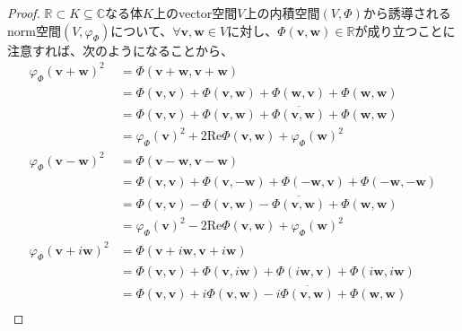 \documentclass[dvipdfmx]{jsarticle}
\begin{document}
\begin{proof}
$\mathbb{R} \subset K \subseteq \mathbb{C}$なる体$K$上のvector空間$V$上の内積空間$(V,\varPhi)$から誘導されるnorm空間$\left( V,\varphi_{\varPhi} \right)$について、$\forall\mathbf{v},\mathbf{w} \in V$に対し、$\varPhi\left( \mathbf{v},\mathbf{w} \right) \in \mathbb{R}$が成り立つことに注意すれば、次のようになることから、
\begin{align*}
{\varphi_{\varPhi}\left( \mathbf{v} + \mathbf{w} \right)}^{2} &= \varPhi\left( \mathbf{v} + \mathbf{w},\mathbf{v} + \mathbf{w} \right)\\
&= \varPhi\left( \mathbf{v},\mathbf{v} \right) + \varPhi\left( \mathbf{v},\mathbf{w} \right) + \varPhi\left( \mathbf{w},\mathbf{v} \right) + \varPhi\left( \mathbf{w},\mathbf{w} \right)\\
&= \varPhi\left( \mathbf{v},\mathbf{v} \right) + \varPhi\left( \mathbf{v},\mathbf{w} \right) + \overline{\varPhi\left( \mathbf{v},\mathbf{w} \right)} + \varPhi\left( \mathbf{w},\mathbf{w} \right)\\
&= {\varphi_{\varPhi}\left( \mathbf{v} \right)}^{2} + 2\mathrm{Re}{\varPhi\left( \mathbf{v},\mathbf{w} \right)} + {\varphi_{\varPhi}\left( \mathbf{w} \right)}^{2}\\
{\varphi_{\varPhi}\left( \mathbf{v} - \mathbf{w} \right)}^{2} &= \varPhi\left( \mathbf{v} - \mathbf{w},\mathbf{v} - \mathbf{w} \right)\\
&= \varPhi\left( \mathbf{v},\mathbf{v} \right) + \varPhi\left( \mathbf{v}, - \mathbf{w} \right) + \varPhi\left( \mathbf{- w},\mathbf{v} \right) + \varPhi\left( \mathbf{- w}, - \mathbf{w} \right)\\
&= \varPhi\left( \mathbf{v},\mathbf{v} \right) - \varPhi\left( \mathbf{v},\mathbf{w} \right) - \overline{\varPhi\left( \mathbf{v},\mathbf{w} \right)} + \varPhi\left( \mathbf{w},\mathbf{w} \right)\\
&= {\varphi_{\varPhi}\left( \mathbf{v} \right)}^{2} - 2\mathrm{Re}{\varPhi\left( \mathbf{v},\mathbf{w} \right)} + {\varphi_{\varPhi}\left( \mathbf{w} \right)}^{2}\\
{\varphi_{\varPhi}\left( \mathbf{v} + i\mathbf{w} \right)}^{2} &= \varPhi\left( \mathbf{v} + i\mathbf{w},\mathbf{v} + i\mathbf{w} \right)\\
&= \varPhi\left( \mathbf{v},\mathbf{v} \right) + \varPhi\left( \mathbf{v},i\mathbf{w} \right) + \varPhi\left( i\mathbf{w},\mathbf{v} \right) + \varPhi\left( i\mathbf{w},i\mathbf{w} \right)\\
&= \varPhi\left( \mathbf{v},\mathbf{v} \right) + i\varPhi\left( \mathbf{v},\mathbf{w} \right) - i\overline{\varPhi\left( \mathbf{v},\mathbf{w} \right)} + \varPhi\left( \mathbf{w},\mathbf{w} \right)\\

\end{align*}
\end{proof}
\end{document}
